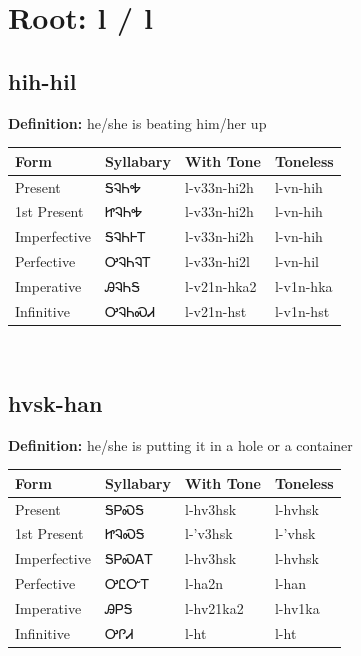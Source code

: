 \documentclass{article}%
\begin{document}
%
\normalsize%
\section*{Root: l / l}%
\subsection*{hih-hil}%
\textbf{Definition: }%
he/she is beating him/her up%
\\[0.5em]%
\begin{tabular}{|l|l|l|l|}%
\hline%
\textbf{Form}&\textbf{Syllabary}&\textbf{With Tone}&\textbf{Toneless}\\%
\hline%
Present&ᎦᎸᏂᎭ&l{-}v33n{-}hi2h&l{-}vn{-}hih\\%
1st Present&ᏥᎸᏂᎭ&l{-}v33n{-}hi2h&l{-}vn{-}hih\\%
Imperfective&ᎦᎸᏂᎰᎢ&l{-}v33n{-}hi2h&l{-}vn{-}hih\\%
Perfective&ᎤᎸᏂᎸᎢ&l{-}v33n{-}hi2l&l{-}vn{-}hil\\%
Imperative&ᎯᎸᏂᎦ&l{-}v21n{-}hka2&l{-}v1n{-}hka\\%
Infinitive&ᎤᎸᏂᏍᏗ&l{-}v21n{-}hst&l{-}v1n{-}hst\\%
\hline%
\end{tabular}%
\\[1em]%
\subsection*{hvsk-han}%
\textbf{Definition: }%
he/she is putting it in a hole or a container%
\\[0.5em]%
\begin{tabular}{|l|l|l|l|}%
\hline%
\textbf{Form}&\textbf{Syllabary}&\textbf{With Tone}&\textbf{Toneless}\\%
\hline%
Present&ᎦᏢᏍᎦ&l{-}hv3hsk&l{-}hvhsk\\%
1st Present&ᏥᎸᏍᎦ&l{-}'v3hsk&l{-}'vhsk\\%
Imperfective&ᎦᏢᏍᎪᎢ&l{-}hv3hsk&l{-}hvhsk\\%
Perfective&ᎤᏝᏅᎢ&l{-}ha2n&l{-}han\\%
Imperative&ᎯᏢᎦ&l{-}hv21ka2&l{-}hv1ka\\%
Infinitive&ᎤᎵᏗ&l{-}ht&l{-}ht\\%
\hline%
\end{tabular}%
\\[1em]%
\end{document}
